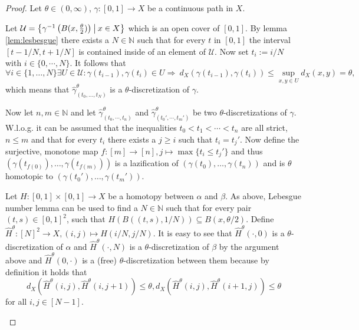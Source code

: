 \documentclass[a4paper, 11pt, twoside]{article}
\newcommand{\N}[0]{\mathbb{N}}
\theoremstyle{break}
\theoremstyle{break}
\begin{document}
\begin{proof}
  Let $\theta \in (0, \infty)$, $\gamma\colon [0,1] \to X$ be a continuous path in $X$. 
  
  Let $\mathcal{U} = \left\{\gamma^{-1}\left(B(x,{\theta \over 2})\right) \: \middle| \: x \in X \right\}$ which is an open cover of $[0,1]$.
  By lemma \ref{lem:lesbesgue} there exists a $N \in \N$ such that for every $t$ in $[0,1]$ the interval $[t-1/N, t+1/N]$ is contained inside of an element of $\mathcal{U}$.
  Now set $t_i := i/N$ with $i \in \{0, \cdots, N\}$. It follows that
  \begin{equation*}
    \forall i \in \{1, \ldots, N\}\exists U \in \mathcal{U}: \gamma(t_{i-1}), \gamma(t_i) \in U \Rightarrow \: d_X(\gamma(t_{i-1}), \gamma(t_i)) \leq \sup\limits_{x,y \in U} d_X(x,y) = \theta,
  \end{equation*}
  which means that $\widehat{\gamma}^{\theta}_{(t_0, \ldots, t_N)}$ is a $\theta$-discretization of $\gamma$.

  Now let $n,m \in \N$ and let $\widehat{\gamma}_{(t_0, \cdots, t_n)}^{\theta}$ and $\widehat{\gamma}_{(t_0', \cdots, t_m')}^{\theta}$ be two $\theta$-discretizations of $\gamma$.
  W.l.o.g. it can be assumed that the inequalities $t_0 < t_1 < \cdots < t_n$ are all strict, $n \leq m$ and that for every $t_i$ there exists a $j \geq i$ such that $t_i = t_j'$.
  Now define the surjective, monotone map $f\colon [m] \to [n], j \mapsto \max \{t_i \leq t_j'\}$ 
  and thus $(\gamma(t_{f(0)}), \ldots, \gamma(t_{f(m)}))$ is a lazification of $(\gamma(t_0), \ldots, \gamma(t_n))$ and is $\theta$ homotopic to $(\gamma(t_0'), \ldots, \gamma(t_m'))$.
  
  Let $H\colon [0,1] \times [0,1] \to X$ be a homotopy between $\alpha$ and $\beta$. As above, Lebesgue number lemma can be used to find a $N \in \N$ 
  such that for every pair $(t,s) \in [0,1]^2$, such that $H(B((t,s),1/N)) \subseteq B(x, \theta/2)$.
  Define $\widehat{H}^{\theta}\colon [N]^2 \to X, (i,j) \mapsto H(i/N, j/N)$. It is easy to see that $\widehat{H}^{\theta}(\cdot, 0)$ is a $\theta$-discretization of $\alpha$ and
  $\widehat{H}^{\theta}(\cdot, N)$ is a $\theta$-discretization of $\beta$ by the argument above and $\widehat{H}^{\theta}(0, \cdot)$ is a (free) $\theta$-discretization between them because by definition it holds that
  \begin{equation*}
    d_X(\widehat{H}^{\theta}(i,j), \widehat{H}^{\theta}(i,j+1)) \leq \theta, d_X(\widehat{H}^{\theta}(i,j), \widehat{H}^{\theta}(i+1,j)) \leq \theta
  \end{equation*}
  for all $i, j \in [N-1]$.

  \cite[p. 4]{vigolo2018fundamental}
\end{proof}
\end{document}
